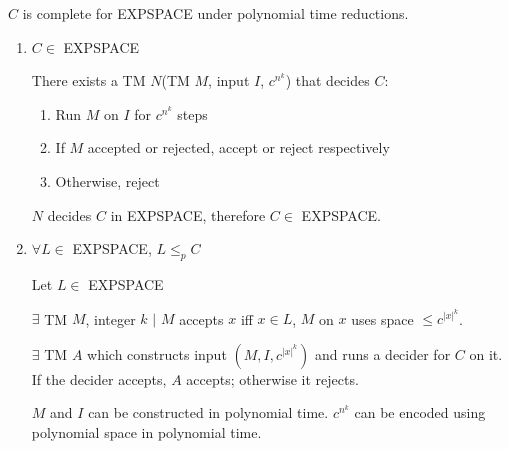\documentclass{article}
\begin{document}
\medskip
$C$ is complete for EXPSPACE under polynomial time reductions.
\begin{enumerate}[label=\arabic*)]
    \item $C \in$ EXPSPACE
    
    There exists a TM $N$(TM $M$, input $I$, $c^{n^{k}}$) that decides $C$:
    \begin{enumerate}[label=]
        \item Run $M$ on $I$ for $c^{n^{k}}$ steps
        \item If $M$ accepted or rejected, accept or reject respectively
        \item Otherwise, reject
    \end{enumerate}

    $N$ decides $C$ in EXPSPACE, therefore $C\in$ EXPSPACE.
    
    
    \item $\forall L \in$ EXPSPACE, $L \leq_{p} C$
    
    Let $L \in$ EXPSPACE
    
    $\exists$ TM $M$, integer $k$ $|$ $M$ accepts $x$ iff $x \in L$, $M$ on $x$ uses space $\leq c^{|x|^{k}}$.
    
    $\exists$ TM $A$ which constructs input $(M,I,c^{|x|^{k}})$ and runs a decider for $C$ on it.  If the decider accepts, $A$ accepts; otherwise it rejects.
    
    $M$ and $I$ can be constructed in polynomial time. $c^{n^{k}}$ can be encoded using polynomial space in polynomial time.
\end{enumerate}
\end{document}
